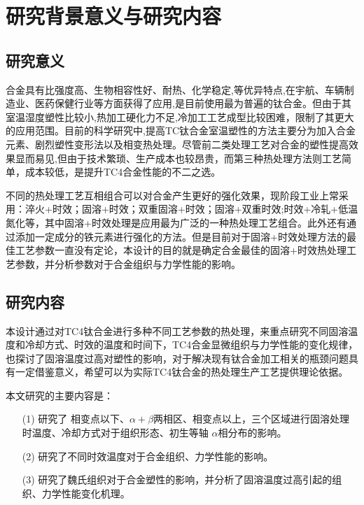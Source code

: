 \section{研究背景意义与研究内容}
\subsection{研究意义}
\ti 合金具有比强度高、生物相容性好、耐热、化学稳定,等优异特点,在宇航、车辆制造业、医药保健行业等方面获得了应用,是目前使用最为普遍的钛合金。但由于其室温湿度塑性比较小,热加工硬化力不足,冷加工工艺成型比较困难，限制了其更大的应用范围。目前的科学研究中,提高TC钛合金室温塑性的方法主要分为加入合金元素、剧烈塑性变形法以及相变热处理。尽管前二类处理工艺对合金的塑性提高效果显而易见,但由于技术繁琐、生产成本也较昂贵\cite{miao}，而第三种热处理方法则工艺简单，成本较低，是提升TC4合金性能的不二之选。

不同的热处理工艺互相组合可以对合金产生更好的强化效果，现阶段工业上常采用\cite{zhoukaixiangJiyushenlengchulidenanjiagongcailiaoqiexiaotexingyanjiu2022}：淬火+时效；固溶+时效；双重固溶+时效；固溶+双重时效;时效+冷轧+低温氮化等，其中固溶+时效处理是应用最为广泛的一种热处理工艺组合。此外还有通过添加一定成分的铁元素进行强化的方法\cite{yuliaoMicrostructuralStrengtheningToughening2022}。但是目前对于固溶+时效处理方法的最佳工艺参数一直没有定论，本设计的目的就是确定\ti 合金最佳的固溶+时效热处理工艺参数，并分析参数对于合金组织与力学性能的影响。

\subsection{研究内容}
本设计通过对TC4钛合金进行多种不同工艺参数的热处理，来重点研究不同固溶温度和冷却方式、时效的温度和时间下，TC4合金显微组织与力学性能的变化规律，也探讨了固溶温度过高对塑性的影响，对于解决现有钛合金加工相关的瓶颈问题具有一定借鉴意义，希望可以为实际TC4钛合金的热处理生产工艺提供理论依据。

本文研究的主要内容是：
\begin{enumerate}
	\item[(1)] 研究了 相变点以下、$ \alpha+\beta $两相区、相变点以上，三个区域进行固溶处理时温度、冷却方式对于组织形态、初生等轴 $ \alpha $相分布的影响。
	\item[(2)] 研究了不同时效温度对于合金组织、力学性能的影响。
	\item[(3)] 研究了魏氏组织对于合金塑性的影响，并分析了固溶温度过高引起的组织、力学性能变化机理。
\end{enumerate}

